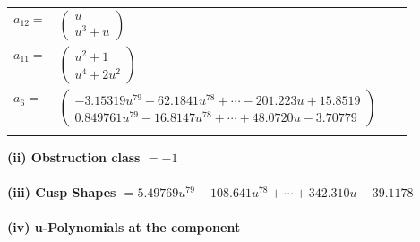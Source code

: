 \documentclass[1p]{elsarticle_modified}
\theoremstyle{definition}
\begin{document}
\begin{tabular}{m{7pt} m{180pt} m{7pt} m{180pt} }
\flushright $a_{12}=$&$\begin{pmatrix}u\\u^3+u\end{pmatrix}$ \\
\flushright $a_{11}=$&$\begin{pmatrix}u^2+1\\u^4+2 u^2\end{pmatrix}$ \\
\flushright $a_{6}=$&$\begin{pmatrix}-3.15319 u^{79}+62.1841 u^{78}+\cdots-201.223 u+15.8519\\0.849761 u^{79}-16.8147 u^{78}+\cdots+48.0720 u-3.70779\end{pmatrix}$\\&\end{tabular}
\flushleft \textbf{(ii) Obstruction class $= -1$}\\~\\
\flushleft \textbf{(iii) Cusp Shapes $= 5.49769 u^{79}-108.641 u^{78}+\cdots+342.310 u-39.1178$}\\~\\
\newpage\renewcommand{\arraystretch}{1}
\flushleft \textbf{(iv) u-Polynomials at the component}\newline \\
\end{document}

